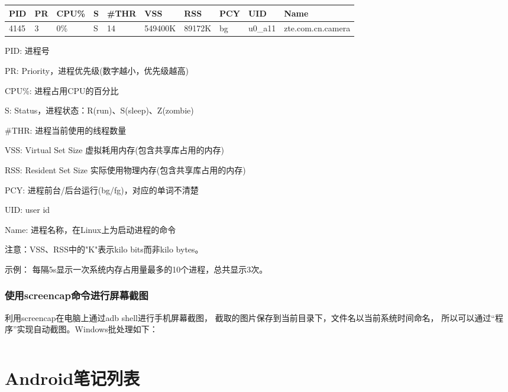 ﻿\documentclass[a4paper,11pt]{article}
\begin{document}
  \begin{center}
  \begin{tabular}{llllllllll}
    PID & PR & CPU\% & S & \#THR & VSS & RSS & PCY & UID & Name\\ \hline
    4145 & 3 & 0\% & S & 14 & 549400K & 89172K & bg & u0\_a11 & zte.com.cn.camera
  \end{tabular}
  \end{center}
  \begin{coloredenumerate}
    \item PID: 进程号
    \item PR: Priority，进程优先级(数字越小，优先级越高)
    \item CPU\%: 进程占用CPU的百分比
    \item S: Status，进程状态：R(run)、S(sleep)、Z(zombie)
    \item \#THR: 进程当前使用的线程数量
    \item VSS: Virtual Set Size 虚拟耗用内存(包含共享库占用的内存)
    \item RSS: Resident Set Size 实际使用物理内存(包含共享库占用的内存)
    \item PCY: 进程前台/后台运行(bg/fg)，对应的单词不清楚
    \item UID: user id
    \item Name: 进程名称，在Linux上为启动进程的命令
  \end{coloredenumerate}
  注意：VSS、RSS中的"K"表示kilo bits而非kilo bytes。\par
  示例：
  每隔5s显示一次系统内存占用量最多的10个进程，总共显示3次。
  
  \section[使用screencap命令进行屏幕截图]{使用screencap命令进行屏幕截图}
  利用screencap在电脑上通过adb shell进行手机屏幕截图，
  截取的图片保存到当前目录下，文件名以当前系统时间命名，
  所以可以通过“程序”实现自动截图。Windows批处理如下：\par\bigskip
  \inputminted[linenos,tabsize=4,bgcolor=srcbg]{bash}{srcdir/capture.bat}
  

  \part[Android Notes List]{Android笔记列表}
\end{document}
